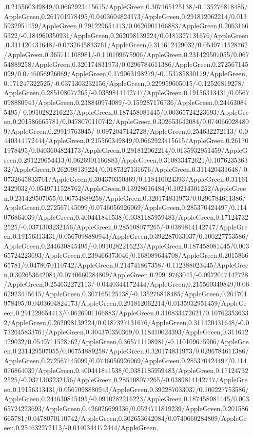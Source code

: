 {\begin{tikzternal}
{,0.215560349849/0.0662923415615/AppleGreen,0.307165125138/-0.135276818485/AppleGreen,0.261701978495/0.0403604824173/AppleGreen,0.291812062214/0.0135932951459/AppleGreen,0.291229654413/0.0626901166883/AppleGreen,0.20631665322/-0.184960350931/AppleGreen,0.262098139224/0.0187327131676/AppleGreen,0.311420431648/-0.0732645833761/AppleGreen,0.311612429032/0.0549711528762/AppleGreen,0.365711108981/-0.110109675906/AppleGreen,0.231429507055/0.06754889258/AppleGreen,0.320174831973/0.0296784611386/AppleGreen,0.272567145099/0.0746056926069/AppleGreen,0.179063198279/-0.153785830179/AppleGreen,0.171247322525/-0.0371303232156/AppleGreen,0.229959605015/-0.12526819278/AppleGreen,0.285108077265/-0.0389814142747/AppleGreen,0.19156313431/0.0567098880943/AppleGreen,0.238840974089/-0.159287176736/AppleGreen,0.244630845495/-0.0910282216223/AppleGreen,0.187458081445/0.00365724223693/AppleGreen,0.201586665781/0.0478070110742/AppleGreen,0.302653642084/0.0740660284809/AppleGreen,0.29919763045/-0.0972047142728/AppleGreen,0.254632272113/-0.0440344172444/AppleGreen,0.215560349849/0.0662923415615/AppleGreen,0.261701978495/0.0403604824173/AppleGreen,0.291812062214/0.0135932951459/AppleGreen,0.291229654413/0.0626901166883/AppleGreen,0.310833472621/0.107623536332/AppleGreen,0.262098139224/0.0187327131676/AppleGreen,0.311420431648/-0.0732645833761/AppleGreen,0.304370350369/0.118410024393/AppleGreen,0.311612429032/0.0549711528762/AppleGreen,0.13928616484/0.10214301252/AppleGreen,0.231429507055/0.06754889258/AppleGreen,0.320174831973/0.0296784611386/AppleGreen,0.272567145099/0.0746056926069/AppleGreen,0.285370424497/0.114076864039/AppleGreen,0.400441841538/0.0381185959483/AppleGreen,0.171247322525/-0.0371303232156/AppleGreen,0.285108077265/-0.0389814142747/AppleGreen,0.19156313431/0.0567098880943/AppleGreen,0.392287033037/0.100227753586/AppleGreen,0.244630845495/-0.0910282216223/AppleGreen,0.187458081445/0.00365724223693/AppleGreen,0.239466373046/0.168089644708/AppleGreen,0.201586665781/0.0478070110742/AppleGreen,0.214741867358/-0.112388023445/AppleGreen,0.302653642084/0.0740660284809/AppleGreen,0.29919763045/-0.0972047142728/AppleGreen,0.254632272113/-0.0440344172444/AppleGreen,0.215560349849/0.0662923415615/AppleGreen,0.307165125138/-0.135276818485/AppleGreen,0.261701978495/0.0403604824173/AppleGreen,0.291812062214/0.0135932951459/AppleGreen,0.291229654413/0.0626901166883/AppleGreen,0.310833472621/0.107623536332/AppleGreen,0.262098139224/0.0187327131676/AppleGreen,0.311420431648/-0.0732645833761/AppleGreen,0.304370350369/0.118410024393/AppleGreen,0.311612429032/0.0549711528762/AppleGreen,0.365711108981/-0.110109675906/AppleGreen,0.231429507055/0.06754889258/AppleGreen,0.320174831973/0.0296784611386/AppleGreen,0.272567145099/0.0746056926069/AppleGreen,0.285370424497/0.114076864039/AppleGreen,0.400441841538/0.0381185959483/AppleGreen,0.171247322525/-0.0371303232156/AppleGreen,0.285108077265/-0.0389814142747/AppleGreen,0.19156313431/0.0567098880943/AppleGreen,0.392287033037/0.100227753586/AppleGreen,0.244630845495/-0.0910282216223/AppleGreen,0.187458081445/0.00365724223693/AppleGreen,0.426026699336/0.0524711819239/AppleGreen,0.201586665781/0.0478070110742/AppleGreen,0.302653642084/0.0740660284809/AppleGreen,0.254632272113/-0.0440344172444/AppleGreen,
}
\end{tikzternal}}
